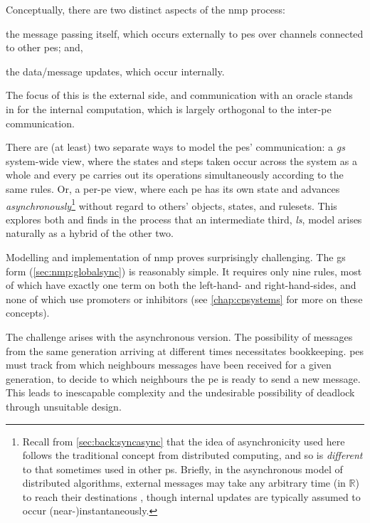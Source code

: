 Conceptually, there are two distinct aspects of the \gls{nmp} process:
\begin{inparaenum}
\item the message passing itself, which occurs externally to \glspl{pe} over channels connected to other \glspl{pe}; and,
\item the data/message updates, which occur internally.
\end{inparaenum}
The focus of this  is the external side, and communication with an oracle stands in for the internal computation, which is largely orthogonal to the inter-\gls{pe} communication.

There are (at least) two separate ways to model the \glspl{pe}' communication:  a \emph{\gls{gs}} system-wide view, where the states and steps taken occur across the system as a whole and every \gls{pe} carries out its operations simultaneously according to the same rules.  Or, a per-\gls{pe} view, where each \gls{pe} has its own state and advances \emph{asynchronously}\footnote{Recall from \vref{sec:back:syncasync} that the idea of asynchronicity used here follows the traditional concept from distributed computing, and so is \emph{different} to that sometimes used in other \gls{ps}.  Briefly, in the asynchronous model of distributed algorithms, external messages may take any arbitrary time (in \(\mathbb{R}\)) to reach their destinations \cite{Balanescu2011,Nicolescu2014,Lynch1996}, though internal updates are typically assumed to occur (near-)instantaneously.} without regard to others' objects, states, and rulesets.  This  explores both and finds in the process that an intermediate third, \emph{\gls{ls}}, model arises naturally as a hybrid of the other two.

Modelling and implementation of \gls{nmp} proves surprisingly challenging.  The \gls{gs} form (\cref{sec:nmp:globalsync}) is reasonably simple.  It requires only nine rules, most of which have exactly one term on both the left-hand- and right-hand-sides, and none of which use \glspl{promoter} or \glspl{inhibitor} (see \cref{chap:cpsystems} for more on these concepts).

The challenge arises with the asynchronous version.  The possibility of messages from the same generation arriving at different times necessitates bookkeeping.
\Glspl{pe} must track from which neighbours messages have been received for a given generation, to decide to which neighbours the \gls{pe} is ready to send a new message.
This leads to inescapable complexity and the undesirable possibility of deadlock through unsuitable design.

